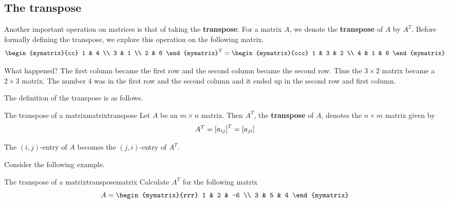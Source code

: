 \subsection{The transpose}

Another important operation on matrices is that of taking the \textbf{transpose}. For a matrix $A$, we denote the
\textbf{transpose} of $A$ by $A^T$. Before formally defining the transpose, we explore this
operation on the following matrix.
\begin{equation*}
\begin{mymatrix}{cc}
1 & 4 \\
3 & 1 \\
2 & 6
\end{mymatrix} ^{T}=\allowbreak \begin{mymatrix}{ccc}
1 & 3 & 2 \\
4 & 1 & 6
\end{mymatrix}
\end{equation*}

What happened? The first column became the first row and the second column
became the second row. Thus the $3\times 2$ matrix became a $2\times 3$
matrix. The number $4$ was in the first row and the second column and it
ended up in the second row and first column. 

The definition of the transpose is as follows.

\begin{definition}{The transpose of a matrix}{matrixtranspose}
Let $A$ be an $m\times n$ matrix. Then $A^{T}$, the \textbf{transpose} of $A$,  denotes the $n\times m$
matrix given by 
\begin{equation*}
A^{T} = \left[ a _{ij}\right] ^{T}= \left[ a_{ji} \right]
\end{equation*}
\end{definition}

The $\left( i, j  \right)$-entry of $A$ becomes the 
$\left( j,i \right)$-entry of $A^T$. 

Consider the following example.

\begin{example}{The transpose of a matrix}{transposematrix}
Calculate $A^T$ for the following matrix
\begin{equation*}
A = \begin{mymatrix}{rrr}
1 & 2 & -6 \\
3 & 5 & 4
\end{mymatrix}
\end{equation*}
\end{example}

